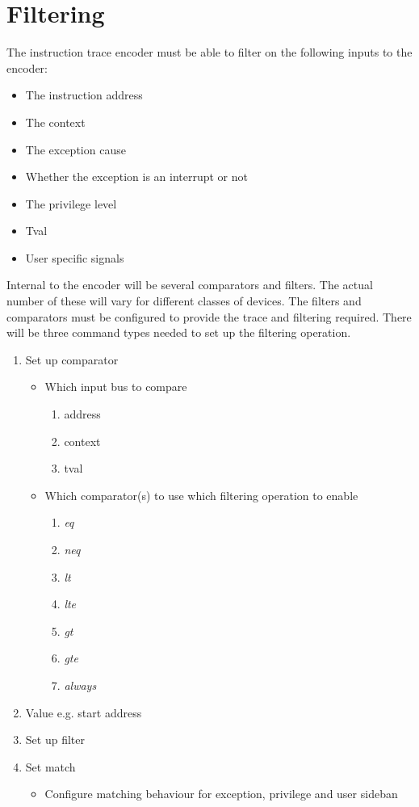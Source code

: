 \chapter{Filtering} \label{ch:filtering}


The instruction trace encoder must be able to filter on the following inputs to the encoder:

\begin{itemize}
  \item The instruction address 
  \item The context 
  \item The exception cause 
  \item Whether the exception is an interrupt or not 
  \item The privilege level
  \item Tval 
  \item User specific signals
\end{itemize}

Internal to the encoder will be several comparators and filters. The
actual number of these will vary for different classes of devices. The
filters and comparators must be configured to provide the trace and
filtering required. There will be three command types needed to set up
the filtering operation.

\begin{enumerate}
    \item Set up comparator 
    \begin{itemize}
      \item Which input bus to compare
        \begin {enumerate}
          \item address
          \item context
          \item tval
        \end{enumerate}
      \item Which comparator(s) to use which filtering operation to enable
        \begin {enumerate}
          \item \textit {eq}
          \item \textit {neq}
          \item \textit {lt}
          \item \textit {lte}
          \item \textit {gt}
          \item \textit {gte}
          \item \textit {always}
          \end{enumerate}
    \end{itemize}

  \item Value e.g. start address
    \item Set up filter 
    \item Set match 
    \begin{itemize}
      \item Configure matching behaviour for exception, privilege and user sideban
    \end{itemize}
\end{enumerate}

